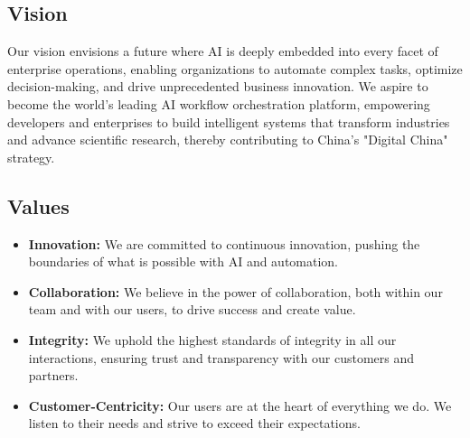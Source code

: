 \documentclass[11pt, a4paper, oneside]{article}
\begin{document}
\subsection{Vision}
Our vision envisions a future where AI is deeply embedded into every facet of enterprise operations, enabling organizations to automate complex tasks, optimize decision-making, and drive unprecedented business innovation. We aspire to become the world's leading AI workflow orchestration platform, empowering developers and enterprises to build intelligent systems that transform industries and advance scientific research, thereby contributing to China's "Digital China" strategy.

\subsection{Values}
\begin{itemize}
    \item \textbf{Innovation:} We are committed to continuous innovation, pushing the boundaries of what is possible with AI and automation.
    \item \textbf{Collaboration:} We believe in the power of collaboration, both within our team and with our users, to drive success and create value.
    \item \textbf{Integrity:} We uphold the highest standards of integrity in all our interactions, ensuring trust and transparency with our customers and partners.
    \item \textbf{Customer-Centricity:} Our users are at the heart of everything we do. We listen to their needs and strive to exceed their expectations.
\end{itemize}
\end{document}
